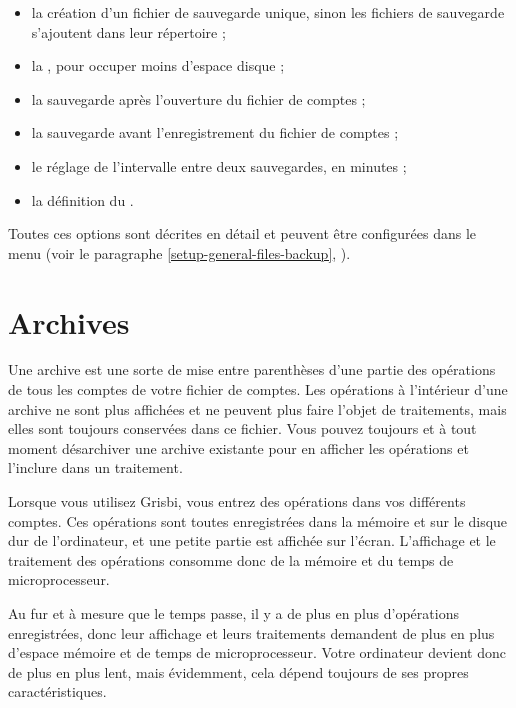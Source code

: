 \begin{itemize}
	\item la création d'un fichier de sauvegarde unique, sinon les fichiers de sauvegarde s'ajoutent dans  leur répertoire ;
	\item la , pour occuper moins d'espace disque ;
	\item la sauvegarde après l'ouverture du fichier de comptes ; 
	\item la sauvegarde avant l'enregistrement du fichier de comptes ; 
	\item le réglage de l'intervalle entre deux sauvegardes, en minutes ;
	\item la définition du .
\end{itemize}

Toutes ces options sont décrites en détail et peuvent être configurées dans le menu  (voir le paragraphe \vref{setup-general-files-backup}, ).


\section{Archives\label{datamanagement-history}}


Une archive est une sorte de \og mise entre parenthèses \fg{} d'une partie des opérations de tous les comptes de votre fichier de comptes. Les opérations à l'intérieur d'une archive ne sont plus affichées et ne peuvent plus faire l'objet de traitements, mais elles sont toujours conservées dans ce fichier. Vous pouvez toujours et à tout moment désarchiver une archive existante pour en afficher les opérations et l'inclure dans un traitement. 

Lorsque vous utilisez Grisbi, vous entrez des opérations dans vos différents comptes. Ces opérations sont toutes enregistrées dans la mémoire et sur le disque dur de l'ordinateur, et une petite partie est affichée sur l'écran. L'affichage et le traitement des opérations consomme donc de la mémoire et du temps de microprocesseur.

Au fur et à mesure que le temps passe, il y a de plus en plus d'opérations enregistrées, donc leur affichage et leurs traitements demandent de plus en plus d'espace mémoire et de temps de microprocesseur. Votre ordinateur devient donc de plus en plus lent, mais évidemment, cela dépend toujours de ses propres caractéristiques.


